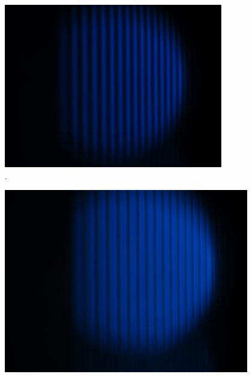 \begin{figure}[h!]
  \centering
  \includegraphics[width=0.85\textwidth]{data/temp/blau_ohneB_90.JPG}
  \caption{\cite{insert Beschriftung 11}.}
  \label{fig:blauOhneB90}
\end{figure}
\begin{figure}[h!]
  \centering
  \includegraphics[width=0.95\textwidth]{data/temp/blau_mitB_90.JPG}
  \caption{\cite{insert Beschriftung 12}}
  \label{fig:blauMitB90}
\end{figure}
